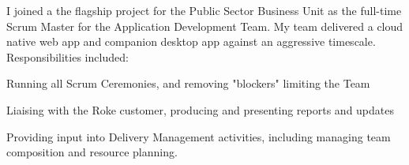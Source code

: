 \sectionsep
{}
I joined a the flagship project for the Public Sector Business Unit as the full-time Scrum Master for the Application Development Team.
My team delivered a cloud native web app and companion desktop app against an aggressive timescale.
Responsibilities included:
\vspace{0.25em}
\begin{tightemize}
  \item Running all Scrum Ceremonies, and removing "blockers" limiting the Team
  \item Liaising with the Roke customer, producing and presenting reports and updates
  \item Providing input into Delivery Management activities, including managing team composition and resource planning.
\end{tightemize}

